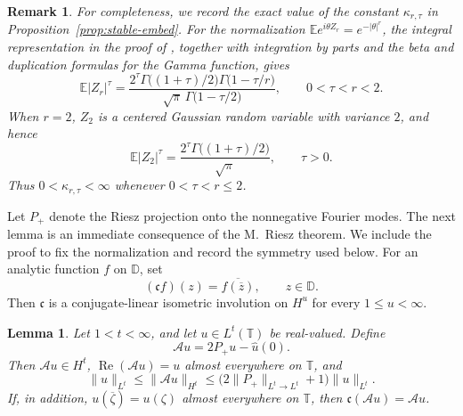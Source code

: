 \documentclass[10pt,a4paper]{amsart}
\newtheorem{lemma}[theorem]{Lemma}
\newtheorem{remark}[theorem]{Remark}
\newcommand{\D}{\mathbb{D}}
\newcommand{\T}{\mathbb{T}}
\begin{document}
\begin{remark}
For completeness, we record the exact value of the constant
\(\kappa_{r,\tau}\) in Proposition~\ref{prop:stable-embed}.
For the normalization
\(\mathbb E e^{i\theta Z_r}=e^{-|\theta|^r}\), the integral
representation in the proof of
\cite[Theorem~6.4.16, p.~173]{AlbiacKalton2016}, together with
integration by parts and the beta and duplication formulas for the
Gamma function, gives
\[
        \mathbb E|Z_r|^\tau
        =
        \frac{
        2^\tau
        \Gamma\bigl((1+\tau)/2\bigr)
        \Gamma\bigl(1-\tau/r\bigr)
        }{
        \sqrt{\pi}\,
        \Gamma\bigl(1-\tau/2\bigr)
        },
        \qquad
        0<\tau<r<2.
\]
When \(r=2\), \(Z_2\) is a centered Gaussian random variable with
variance \(2\), and hence
\[
        \mathbb E|Z_2|^\tau
        =
        \frac{
        2^\tau\Gamma\bigl((1+\tau)/2\bigr)
        }{
        \sqrt{\pi}
        },
        \qquad
        \tau>0.
\]
Thus \(0<\kappa_{r,\tau}<\infty\) whenever
\(0<\tau<r\le2\).
\end{remark}

Let \(P_+\) denote the Riesz projection onto the nonnegative Fourier
modes.  The next lemma is an immediate consequence of the M.~Riesz theorem.
We include the proof to fix the normalization and record the symmetry used below.  
For an analytic function \(f\) on \(\D\), set
\[
        (\mathfrak cf)(z)
        =
        \overline{f(\overline z)},
        \qquad
        z\in\D.
\]
Then \(\mathfrak c\) is a conjugate-linear isometric involution on
\(H^u\) for every \(1\le u<\infty\).

\begin{lemma}
\label{lem:real-lift}
Let \(1<t<\infty\), and let \(u\in L^t(\T)\) be real-valued. Define
\[
        \mathcal Au=2P_+u-\widehat u(0).
\]
Then \(\mathcal Au\in H^t\),
\(\operatorname{Re}(\mathcal Au)=u\) almost everywhere on \(\T\), and
\begin{equation}
\label{eq:lift-norm}
        \|u\|_{L^t}
        \le
        \|\mathcal Au\|_{H^t}
        \le
        \bigl(2\|P_+\|_{L^t\to L^t}+1\bigr)\|u\|_{L^t}.
\end{equation}
If, in addition,
\(u(\overline\zeta)=u(\zeta)\) almost everywhere on \(\T\), then
\(\mathfrak c(\mathcal Au)=\mathcal Au\).
\end{lemma}
\end{document}
